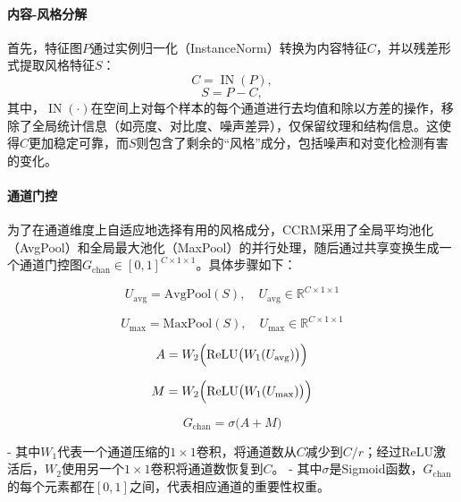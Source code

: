 \paragraph{内容-风格分解}
首先，特征图$P$通过实例归一化（InstanceNorm）转换为内容特征$C$，并以残差形式提取风格特征$S$：
\begin{equation}\label{eq:ccr_in}
C = \operatorname{IN}(P),
\end{equation}
\begin{equation}\label{eq:ccr_residual}
S = P - C,
\end{equation}
其中，\(\operatorname{IN}(\cdot)\)在空间上对每个样本的每个通道进行去均值和除以方差的操作，移除了全局统计信息（如亮度、对比度、噪声差异），仅保留纹理和结构信息。这使得\(C\)更加稳定可靠，而\(S\)则包含了剩余的“风格”成分，包括噪声和对变化检测有害的变化。

\paragraph{通道门控}
为了在通道维度上自适应地选择有用的风格成分，CCRM采用了全局平均池化（AvgPool）和全局最大池化（MaxPool）的并行处理，随后通过共享变换生成一个通道门控图\(G_{\mathrm{chan}}\in[0,1]^{C\times1\times1}\)。具体步骤如下：

\begin{equation}\label{eq:ccr_avg_pool}
U_{\mathrm{avg}} = \mathrm{AvgPool}(S), \quad U_{\mathrm{avg}} \in \mathbb{R}^{C\times1\times1}
\end{equation}

\begin{equation}\label{eq:ccr_max_pool}
U_{\mathrm{max}} = \mathrm{MaxPool}(S), \quad U_{\mathrm{max}} \in \mathbb{R}^{C\times1\times1}
\end{equation}

\begin{equation}\label{eq:ccr_fc_avg}
A = W_2\Bigl(\mathrm{ReLU}\bigl(W_1(U_{\mathrm{avg}})\bigr)\Bigr)
\end{equation}

\begin{equation}\label{eq:ccr_fc_max}
M = W_2\Bigl(\mathrm{ReLU}\bigl(W_1(U_{\mathrm{max}})\bigr)\Bigr)
\end{equation}

\begin{equation}\label{eq:ccr_chan_gate}
G_{\mathrm{chan}} = \sigma\bigl(A + M\bigr)
\end{equation}

- 其中$W_1$代表一个通道压缩的$1\times1$卷积，将通道数从$C$减少到$C/r$；经过ReLU激活后，$W_2$使用另一个$1\times1$卷积将通道数恢复到$C$。
- 其中$\sigma$是Sigmoid函数，$G_{\mathrm{chan}}$的每个元素都在$[0,1]$之间，代表相应通道的重要性权重。

